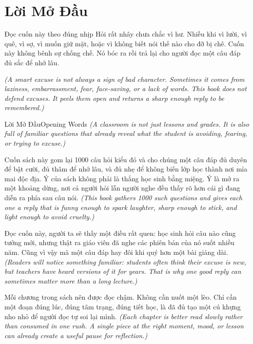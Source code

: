 \chapter*{Lời Mở Đầu}

\begin{quotecard}{Đọc cuốn này theo đúng nhịp}
Hỏi rất nhây chưa chắc vì hư. Nhiều khi vì lười, vì quê, vì sợ, vì muốn giữ mặt, hoặc vì không biết nói thế nào cho đỡ bị chê. Cuốn này không bênh sự chống chế. Nó bóc ra rồi trả lại cho người đọc một câu đáp đủ sắc để nhớ lâu.

\textit{(A smart excuse is not always a sign of bad character. Sometimes it comes from laziness, embarrassment, fear, face-saving, or a lack of words. This book does not defend excuses. It peels them open and returns a sharp enough reply to be remembered.)}
\end{quotecard}

\begin{truyen}{Lời Mở Đầu}{Opening Words}
\textit{(A classroom is not just lessons and grades. It is also full of familiar questions that already reveal what the student is avoiding, fearing, or trying to excuse.)}

Cuốn sách này gom lại 1000 câu hỏi kiểu đó và cho chúng một câu đáp đủ duyên để bật cười, đủ thâm để nhớ lâu, và đủ nhẹ để không biến lớp học thành nơi mỉa mai độc địa. Ý của sách không phải là thắng học sinh bằng miệng. Ý là mở ra một khoảng dừng, nơi cả người hỏi lẫn người nghe đều thấy rõ hơn cái gì đang diễn ra phía sau câu nói.
\textit{(This book gathers 1000 such questions and gives each one a reply that is funny enough to spark laughter, sharp enough to stick, and light enough to avoid cruelty.)}

Đọc cuốn này, người ta sẽ thấy một điều rất quen: học sinh hỏi câu nào cũng tưởng mới, nhưng thật ra giáo viên đã nghe các phiên bản của nó suốt nhiều năm. Cũng vì vậy mà một câu đáp hay đôi khi quý hơn một bài giảng dài.
\textit{(Readers will notice something familiar: students often think their excuse is new, but teachers have heard versions of it for years. That is why one good reply can sometimes matter more than a long lecture.)}

Mỗi chương trong sách nên được đọc chậm. Không cần nuốt một lèo. Chỉ cần một đoạn đúng lúc, đúng tâm trạng, đúng tiết học, là đã đủ tạo một cú khựng nho nhỏ để người đọc tự soi lại mình.
\textit{(Each chapter is better read slowly rather than consumed in one rush. A single piece at the right moment, mood, or lesson can already create a useful pause for reflection.)}
\end{truyen}

